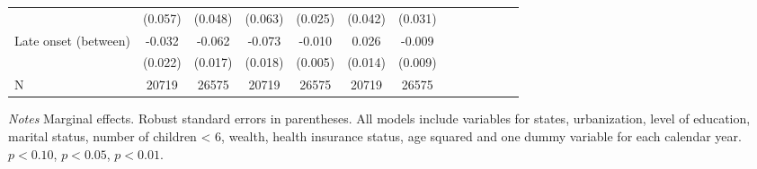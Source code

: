 \documentclass[10pt,letterpaper]{article}
\begin{document}
\begin{table}[!ht]
\begin{center}
\begin{adjustbox}{max width=\linewidth}
\begin{threeparttable}
{\begin{tabular}{l*{6}{S S}}
					&  (0.057)         &  (0.048)         &  (0.063)         &  (0.025)         &  (0.042)         &  (0.031)         \\
					Late onset (between)&   -0.032         &   -0.062\sym{***}&   -0.073\sym{***}&   -0.010\sym{*}  &    0.026\sym{*}  &   -0.009         \\
					&  (0.022)         &  (0.017)         &  (0.018)         &  (0.005)         &  (0.014)         &  (0.009)         \\
					\midrule
					N         &    20719         &    26575         &    20719         &    26575         &    20719         &    26575         \\
						\bottomrule
					\end{tabular}
					\begin{tablenotes}
						\item \footnotesize \textit{Notes} Marginal effects. Robust standard errors in parentheses. All models include variables for  states, urbanization, level of education, marital status, number of children < 6, wealth, health insurance status, age squared and one dummy variable for each calendar year. \sym{*} \(p<0.10\), \sym{**} \(p<0.05\), \sym{***} \(p<0.01\).
					\end{tablenotes}
				}
			\end{threeparttable}
		\end{adjustbox}
	\end{center}
\end{table} 
\end{document}
